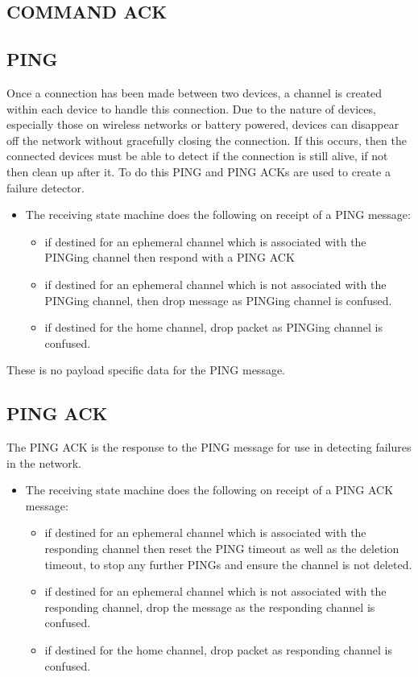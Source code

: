 \subsection{COMMAND ACK} %
\label{sub:command_ack}

\subsection{PING} %
\label{sub:ping}
Once a connection has been made between two devices, a channel is created within each device to handle this connection. Due to the nature of devices, especially those on wireless networks or battery powered, devices can disappear off the network without gracefully closing the connection. If this occurs, then the connected devices must be able to detect if the connection is still alive, if not then clean up after it. To do this PING and PING ACKs are used to create a failure detector.

\begin{itemize}
	\item []The receiving state machine does the following on receipt of a PING message:
	\begin{itemize}
		\item if destined for an ephemeral channel which is associated with the PINGing channel then respond with a PING ACK
		\item if destined for an ephemeral channel which is not associated with the PINGing channel, then drop message as PINGing channel is confused.
		\item if destined for the home channel, drop packet as PINGing channel is confused.
	\end{itemize}
\end{itemize}

These is no payload specific data for the PING message.

\subsection{PING ACK} %
\label{sub:ping_ack}
The PING ACK is the response to the PING message for use in detecting failures in the network.

\begin{itemize}
	\item []The receiving state machine does the following on receipt of a PING ACK message:
	\begin{itemize}
		\item if destined for an ephemeral channel which is associated with the responding channel then reset the PING timeout as well as the deletion timeout, to stop any further PINGs and ensure the channel is not deleted. 
		\item if destined for an ephemeral channel which is not associated with the responding channel, drop the message as the responding channel is confused.
		\item if destined for the home channel, drop packet as responding channel is confused.
	\end{itemize}
\end{itemize}

